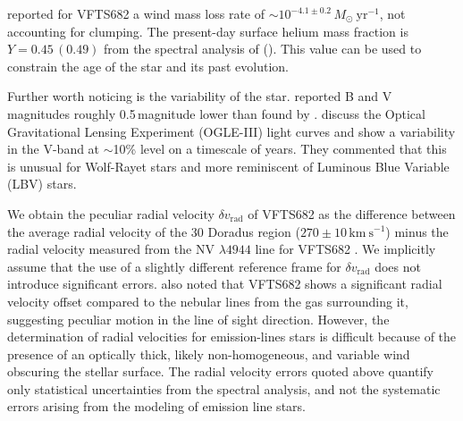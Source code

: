 \documentclass[a4paper,fleqn,usenatbib]{mnras}
\newcommand{\kms}{{\,\mathrm{km\ s^{-1}}}}
\newcommand{\Msun}{{\,\mathrm{M}_\odot}}
\begin{document}
\citet{bestenlehner:11} reported for VFTS682 a wind mass loss rate of
$\sim10^{-4.1\pm0.2}\,M_\odot \ \mathrm{yr}^{-1}$, %
not accounting for
clumping. The present-day surface helium mass
fraction is $Y=0.45\, (0.49)$ from the spectral analysis of
\cite{bestenlehner:11} (\citealt{rubio-diez:17}). This value can be
used to constrain the age of the star and its past evolution.


Further worth noticing is the variability of the
star. \citet{parker:93} reported B and V magnitudes roughly 0.5\,magnitude
lower than found by \citet{evans:11}.
\citet{bestenlehner:11} discuss the Optical Gravitational Lensing
Experiment (OGLE-III) light curves \citep{udalski:08} and show a
variability in the V-band at $\sim$10\% level on a timescale of years.
They commented that this is unusual for Wolf-Rayet stars and more reminiscent
of Luminous Blue Variable (LBV) stars. %

We obtain the peculiar radial velocity $\delta v_\mathrm{rad}$ of VFTS682 as the difference
between the average radial velocity of the 30 Doradus region
($270\pm10\kms$) minus the radial velocity measured from the NV $\lambda4944$
line for VFTS682  \citep[$300\pm10\kms$, ][]{bestenlehner:11}. We implicitly assume that the use
of a slightly different reference frame for $\delta v_\mathrm{rad}$ does not
introduce significant errors. \cite{bressert:12} also noted that VFTS682 shows a significant radial velocity offset compared to the nebular
lines from the gas surrounding it, suggesting peculiar motion in the
line of sight direction. However, the determination of
radial velocities for emission-lines stars is difficult because of the
presence of an optically thick, likely non-homogeneous, and variable
wind obscuring the stellar surface. The radial velocity errors quoted
above quantify only statistical uncertainties from the
spectral analysis, and not the systematic errors arising from the
modeling of emission line stars.
\end{document}
